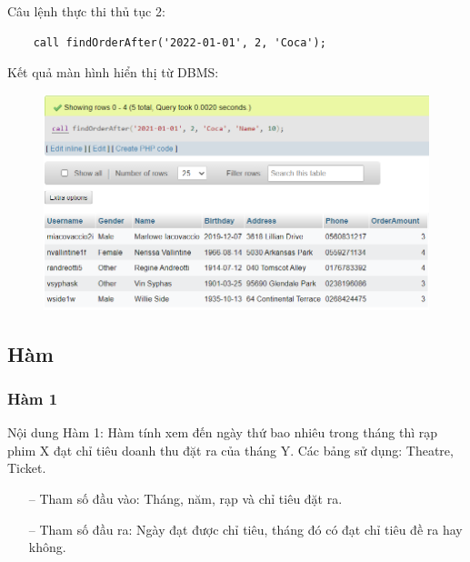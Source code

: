 Câu lệnh thực thi thủ tục 2:
\begin{verbatim}
    call findOrderAfter('2022-01-01', 2, 'Coca');
\end{verbatim}
\newpage
Kết quả màn hình hiển thị từ DBMS:
\begin{figure}[h]
    \centering
    \includegraphics[scale=0.7]{images/findOrderAfter.png}
\end{figure}
\subsection{Hàm}
\subsubsection{Hàm 1}
Nội dung Hàm 1: Hàm tính xem đến ngày thứ bao nhiêu trong tháng thì rạp phim X đạt chỉ tiêu doanh thu đặt ra của tháng Y.
Các bảng sử dụng: Theatre, Ticket.
\begin{itemize}
    \item[--] Tham số đầu vào: Tháng, năm, rạp và chỉ tiêu đặt ra.
    
    \item[--] Tham số đầu ra: Ngày đạt được chỉ tiêu, tháng đó có đạt chỉ tiêu đề ra hay không.
   
\end{itemize}

